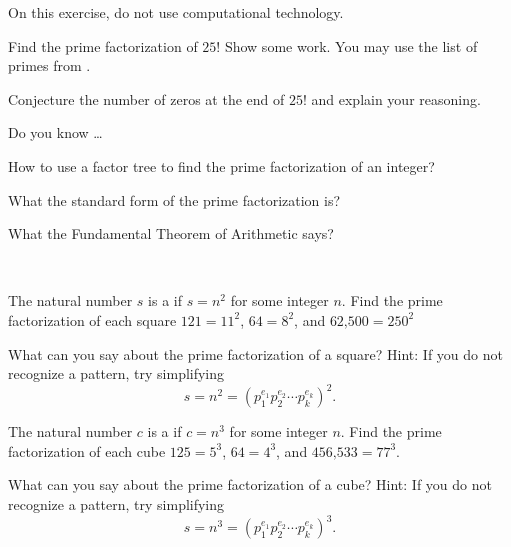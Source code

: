 \begin{exer}[\exerU] %
\label{exer_prime_fact_25!} 
    On this exercise, do not use computational technology.
    \begin{exerpart}
        \item Find the prime factorization of $25!$  Show some work. You may use the list of primes from .
        \item Conjecture the number of zeros at the end of $25!$ and explain your reasoning.
    \end{exerpart}   
\end{exer}

\begin{exer}[\exerR] %
\label{exer_dyk_prime_fact}
    Do you know \ldots
        \begin{exerpart}
            \item How to use a factor tree to find the prime factorization of an integer?
            \item What the standard form of the prime factorization is?
            \item What the Fundamental Theorem of Arithmetic says?
        \end{exerpart}
\end{exer}

\begin{exer}[\exerE] %
\label{exer_prime_fact_sq_cube}
~
    \begin{exerpart}
        \item The natural number $s$ is a  if $s = n^2$ for some integer $n$.  Find the prime factorization of each square $121 = 11^2$, $64 = 8^2$, and $\text{62,500}=250^2$
        \item What can you say about the prime factorization of a square? Hint: If you do not recognize a pattern, try simplifying $$s = n^2 = \left(p_1^{e_1}p_2^{e_2} \cdots p_k^{e_k}\right)^2.$$
        \item The natural number $c$ is a  if $c = n^3$ for some integer $n$.  Find the prime factorization of each cube $125 = 5^3$, $64 = 4^3$, and $\text{456,533} = 77^3$.
        \item What can you say about the prime factorization of a cube? Hint: If you do not recognize a pattern, try simplifying $$s = n^3 = \left(p_1^{e_1}p_2^{e_2} \cdots p_k^{e_k}\right)^3.$$
    \end{exerpart}
\end{exer}

